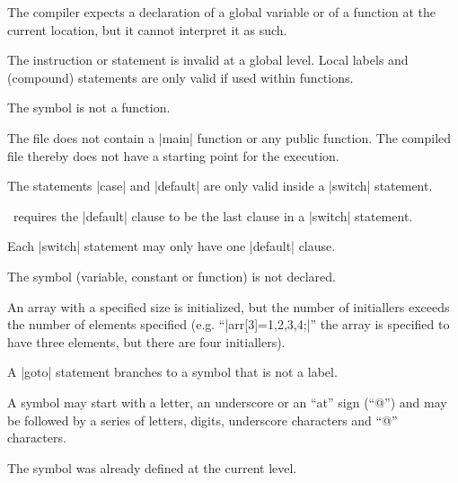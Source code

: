 { 
        The compiler expects a declaration of a global variable or of a
        function at the current location, but it cannot interpret it as such.

 
        The instruction or statement is invalid at a global level. Local
        labels and (compound) statements are only valid if used within
        functions.

 
        The symbol is not a function.

 
        The file does not contain a |main| function or any public function.
        The compiled file thereby does not have a starting point for the
        execution.

 
        The statements |case| and |default| are only valid inside a
        |switch| statement.

 
        \Small\ requires the |default| clause to be the last clause in a
        |switch| statement.

 
        Each |switch| statement may only have one |default| clause.

 
        The symbol (variable, constant or function) is not declared.

        An array with a specified size is initialized, but the number of
        initiallers exceeds the number of elements specified (e.g.
        ``|arr[3]={1,2,3,4};|'' the array is specified to have three
        elements, but there are four initiallers).

 
        A |goto| statement branches to a symbol that is not a label.

        A symbol may start with a letter, an underscore or an ``at'' sign (``@'')
        and may be followed by a series of letters, digits, underscore
        characters and ``@'' characters.

 
        The symbol was already defined at the current level.

}
